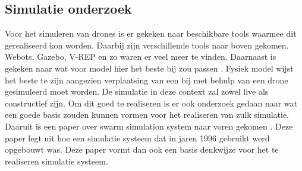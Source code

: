\subsection{Simulatie onderzoek}
Voor het simuleren van drones is er gekeken naar beschikbare tools waarmee dit gerealiseerd kon worden. Daarbij
zijn verschillende tools naar boven gekomen. Webots, Gazebo, V-REP en zo waren er veel meer te vinden. Daarnaast is
gekeken naar wat voor model hier het beste bij zou passen \cite{Weisberg2013}. Fysiek model wijst het beste te zijn
aangezien verplaatsing van een bij met behulp van een drone gesimuleerd moet worden. De simulatie in deze context 
zal zowel live als constructief zijn. Om dit goed te realiseren is er ook onderzoek gedaan naar wat een 
goede basis zouden kunnen vormen voor het realiseren van zulk simulatie. Daaruit is een paper over swarm simulation system
naar voren gekomen \cite{minar1996swarm}. Deze paper legt uit hoe een simulatie systeem dat in jaren 1996 gebruikt werd opgebouwt was.
Deze paper vormt dan ook een basis denkwijze voor het te realiseren simulatie systeem.